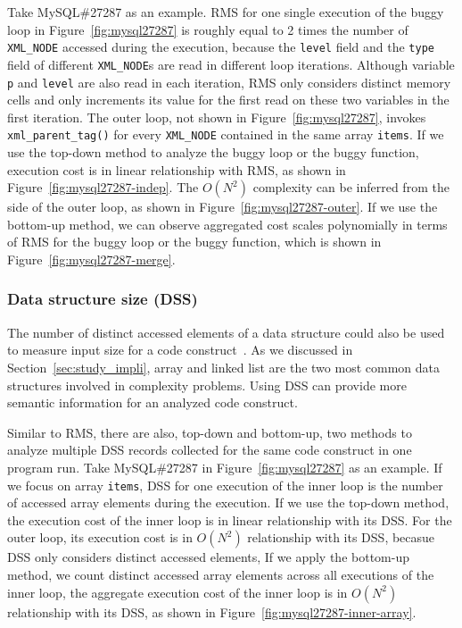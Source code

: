 Take MySQL\#27287 as an example.
RMS for one single execution of
the buggy loop in Figure~\ref{fig:mysql27287}
is roughly equal to 2 times the number of \texttt{XML\_NODE} 
accessed during the execution, 
because the \texttt{level} field and the \texttt{type} field of 
different \texttt{XML\_NODE}s are read in different loop iterations.
Although variable \texttt{p} and \texttt{level} are also read in each iteration,
RMS only considers distinct memory cells and 
only increments its value for the first read on these two variables in the first iteration. 
The outer loop, not shown in Figure~\ref{fig:mysql27287}, 
invokes \texttt{xml\_parent\_tag()} for every \texttt{XML\_NODE} contained
in the same array \texttt{items}.
If we use the top-down method to analyze the buggy loop
or the buggy function, 
execution cost is in linear relationship with RMS, 
as shown in Figure~\ref{fig:mysql27287-indep}.
The $O(N^2)$ complexity can be inferred from the side of the outer loop, 
as shown in Figure~\ref{fig:mysql27287-outer}. 
If we use the bottom-up method, 
we can observe aggregated cost scales 
polynomially in terms of RMS for the buggy loop 
or the buggy function, 
which is shown in Figure~\ref{fig:mysql27287-merge}. 

\subsubsection{Data structure size (DSS)}
The number of distinct accessed elements of a data 
structure could also be used to measure 
input size for a code construct~\cite{AlgoProf}. 
As we discussed in Section~\ref{sec:study_impli},
array and linked list are the two most common 
data structures involved in complexity problems. 
Using DSS can provide more semantic information for an 
analyzed code construct.


Similar to RMS, there are also, top-down and bottom-up, 
two methods to analyze 
multiple DSS records collected for the same code 
construct in one program run.
Take MySQL\#27287 in Figure~\ref{fig:mysql27287} as an example.
If we focus on array \texttt{items},
DSS for one execution of the inner loop is the number of 
accessed array elements during the execution.
If we use the top-down method, the execution cost 
of the inner loop is in linear relationship with its DSS.
For the outer loop, its execution cost is in $O(N^2)$ relationship with its DSS,
becasue DSS only considers distinct accessed elements,
If we apply the bottom-up method, 
we count distinct accessed array elements across all executions of the inner loop,
the aggregate execution cost of the inner loop is in $O(N^2)$ relationship with its DSS, 
as shown in Figure~\ref{fig:mysql27287-inner-array}.   


